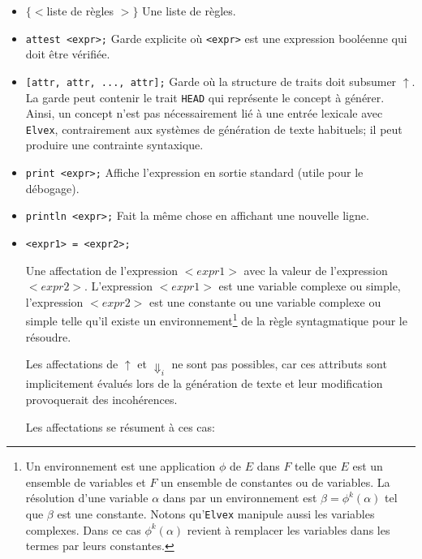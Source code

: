 \documentclass[11pt]{article}
\begin{document}
\begin{itemize}

\item $\{<$liste de règles $>\}$ Une liste de règles.

\item \verb#attest <expr>;# Garde explicite où \verb#<expr># est une
  expression booléenne qui doit être vérifiée.

\item \verb#[attr, attr, ..., attr];# Garde où la structure de traits
  doit subsumer $\uparrow$. La garde peut contenir le trait
  \verb#HEAD# qui représente le concept à générer. Ainsi, un concept
  n'est pas nécessairement lié à une entrée lexicale avec
  \texttt{Elvex}, contrairement aux systèmes de génération de texte
  habituels; il peut produire une contrainte syntaxique.

\item \verb#print <expr>;# Affiche l'expression en sortie standard
  (utile pour le débogage).

\item \verb#println <expr>;# Fait la même chose en affichant une
  nouvelle ligne.
  
\item  \verb#<expr1> = <expr2>;#
  
  Une affectation de l'expression $<expr1>$ avec la valeur de
  l'expression $<expr2>$. L'expression $<expr1>$ est une variable
  complexe ou simple, l'expression $<expr2>$ est une constante ou une
  variable complexe ou simple telle qu'il existe un
  environnement\footnote{Un environnement est une application $\phi$
    de $E$ dans $F$ telle que $E$ est un ensemble de variables et $F$
    un ensemble de constantes ou de variables. La résolution d'une
    variable $\alpha$ dans par un environnement est
    $\beta = \phi^k(\alpha)$ tel que $\beta$ est une constante. Notons
    qu'\texttt{Elvex} manipule aussi les variables complexes. Dans ce cas
    $\phi^k(\alpha)$ revient à remplacer les variables dans les
    termes par leurs constantes.} de la règle syntagmatique pour le
  résoudre.
  
  Les affectations de $\uparrow$ et $\Downarrow_i$ ne sont pas
  possibles, car ces attributs sont implicitement évalués lors de la
  génération de texte et leur modification provoquerait des
  incohérences.

Les affectations se résument à ces cas:

  \begin{itemize}
    

\end{itemize}
\end{itemize}
\end{document}
